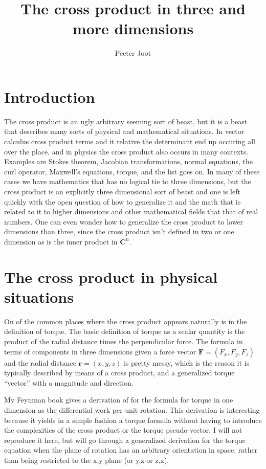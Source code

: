 \documentclass{article}      %
\title{The cross product in three and more dimensions} %
\author{Peeter Joot}         %
\newcommand{\Br}[0]{\mathbf{r}}
\newcommand{\BF}[0]{\mathbf{F}}
\newcommand{\Cn}[0]{\mathbf{C}^n}
\begin{document}

\maketitle{}

\section{Introduction}

The cross product is an ugly arbitrary seeming sort of beast, but it is a beast that
describes many sorts of physical and mathematical situations.  In vector calculus
cross product terms and it relative the determinant end up occuring all over the place,
and in physics the cross product also occurs in many contexts.
Examples are Stokes theorem, Jacobian transformations, normal equations, the
curl operator, Maxwell's equations, torque, and the list goes on.  In many of
these cases we have mathematics that has no logical tie to three dimensions, but
the cross product is an explicitly three dimensional sort of beast and one is
left quickly with the open question of how to generalize it and the math that
is related to it to higher dimensions and other mathematical fields that that
of real numbers.  One can even wonder how to generalize the cross product to
lower dimensions than three, since the cross product isn't defined in two or
one dimension as is the inner product in $\Cn$.

\section{The cross product in physical situations}

On of the common places where the cross product appears naturally is in the
definition of torque.
The basic definition of torque as a scalar quantity is the product of the radial distance times
the perpendicular force.  The formula in terms of components in three dimensions given a force vector
$\BF = (F_x, F_y, F_z)$ and the
radial distance $\Br = (x, y, z)$ is pretty messy, which is the reason it
is typically described by means of a cross product, and
a generalized torque ``vector'' with a magnitude and direction.

My Feynman book gives a derivation of for the formula for torque in one dimension as
the differential work per unit rotation.  This derivation is interesting
because it yields in a simple fashion a torque formula without having to
introduce the complexities of the cross product or the torque pseudo-vector.  I will
not reproduce it here, but will go through a generalized derivation for the torque
equation when the plane of rotation has an arbitrary orientation in space, rather
than being restricted to the x,y plane (or y,z or z,x).
\end{document}
